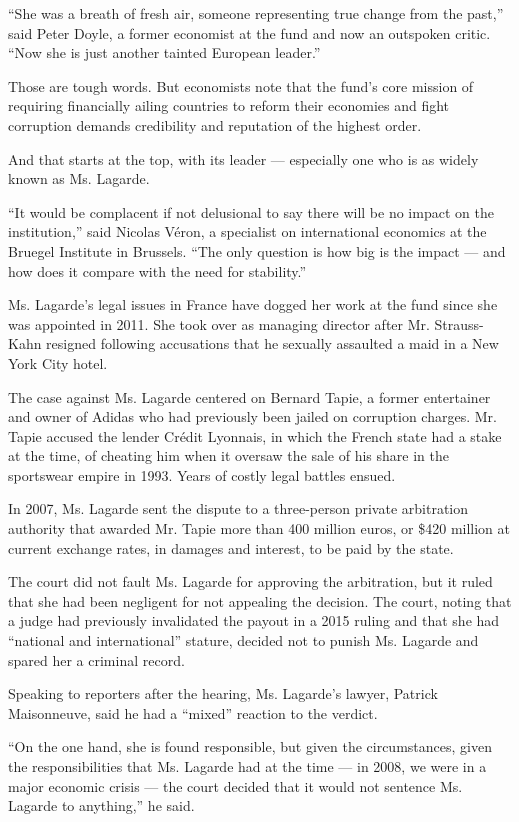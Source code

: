 ``She was a breath of fresh air, someone representing true change from
the past,'' said Peter Doyle, a former economist at the fund and now an
outspoken critic. ``Now she is just another tainted European leader.''

Those are tough words. But economists note that the fund's core mission
of requiring financially ailing countries to reform their economies and
fight corruption demands credibility and reputation of the highest
order.

And that starts at the top, with its leader --- especially one who is as
widely known as Ms. Lagarde.

``It would be complacent if not delusional to say there will be no
impact on the institution,'' said Nicolas Véron, a specialist on
international economics at the Bruegel Institute in Brussels. ``The only
question is how big is the impact --- and how does it compare with the
need for stability.''

Ms. Lagarde's legal issues in France have dogged her work at the fund
since she was appointed in 2011. She took over as managing director
after Mr. Strauss-Kahn resigned following accusations that he sexually
assaulted a maid in a New York City hotel.

The case against Ms. Lagarde centered on Bernard Tapie, a former
entertainer and owner of Adidas who had previously been jailed on
corruption charges. Mr. Tapie accused the lender Crédit Lyonnais, in
which the French state had a stake at the time, of cheating him when it
oversaw the sale of his share in the sportswear empire in 1993. Years of
costly legal battles ensued.

In 2007, Ms. Lagarde sent the dispute to a three-person private
arbitration authority that awarded Mr. Tapie more than 400 million
euros, or \$420 million at current exchange rates, in damages and
interest, to be paid by the state.

The court did not fault Ms. Lagarde for approving the arbitration, but
it ruled that she had been negligent for not appealing the decision. The
court, noting that a judge had previously invalidated the payout in a
2015 ruling and that she had ``national and international'' stature,
decided not to punish Ms. Lagarde and spared her a criminal record.

Speaking to reporters after the hearing, Ms. Lagarde's lawyer, Patrick
Maisonneuve, said he had a ``mixed'' reaction to the verdict.

``On the one hand, she is found responsible, but given the
circumstances, given the responsibilities that Ms. Lagarde had at the
time --- in 2008, we were in a major economic crisis --- the court
decided that it would not sentence Ms. Lagarde to anything,'' he said.

